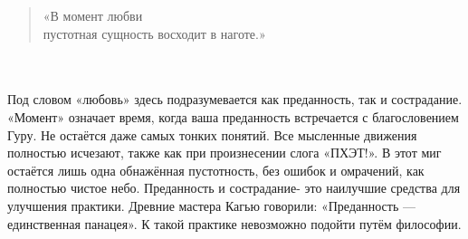 \begin{verse}
«В момент любви \\ \indent пустотная сущность восходит в наготе.»
\end{verse}
\\ \\ Под словом «любовь» здесь подразумевается как преданность, так и сострадание. «Момент» означает время, когда ваша преданность встречается с благословением Гуру. Не остаётся даже самых тонких понятий. Все мысленные движения полностью исчезают, также как при произнесении слога «ПХЭТ!». В этот миг остаётся лишь одна обнажённая пустотность, без ошибок и омрачений, как полностью чистое небо. Преданность и сострадание- это наилучшие средства для улучшения практики. Древние мастера Кагью говорили: «Преданность — единственная панацея». К такой практике невозможно подойти путём философии.

